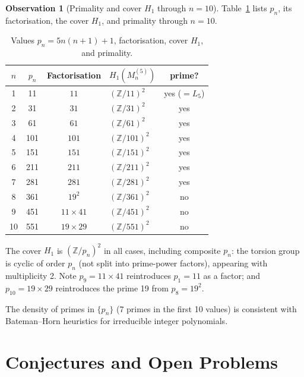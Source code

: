 \documentclass[11pt,a4paper]{article}
\theoremstyle{definition}
\newtheorem{observation}[theorem]{Observation}
\newcommand{\ZZ}{\mathbb{Z}}
\begin{document}
\begin{observation}[Primality and cover $H_1$ through $n=10$]
Table~\ref{tab:primality} lists $p_n$, its factorisation,
the cover $H_1$, and primality through $n=10$.

\begin{table}[htbp]
\centering
\caption{Values $p_n=5n(n+1)+1$, factorisation,
cover $H_1$, and primality.}
\label{tab:primality}
\begin{tabular}{ccclc}
\toprule
$n$ & $p_n$ & Factorisation & $H_1(M_n^{(5)})$ & prime? \\
\midrule
 1 &   11 & $11$           & $(\ZZ/11)^2$  & yes ($=L_5$) \\
 2 &   31 & $31$           & $(\ZZ/31)^2$  & yes \\
 3 &   61 & $61$           & $(\ZZ/61)^2$  & yes \\
 4 &  101 & $101$          & $(\ZZ/101)^2$ & yes \\
 5 &  151 & $151$          & $(\ZZ/151)^2$ & yes \\
 6 &  211 & $211$          & $(\ZZ/211)^2$ & yes \\
 7 &  281 & $281$          & $(\ZZ/281)^2$ & yes \\
 8 &  361 & $19^2$         & $(\ZZ/361)^2$ & no \\
 9 &  451 & $11\times41$   & $(\ZZ/451)^2$ & no \\
10 &  551 & $19\times29$   & $(\ZZ/551)^2$ & no \\
\bottomrule
\end{tabular}
\end{table}

The cover $H_1$ is $(\ZZ/p_n)^2$ in all cases, including
composite $p_n$: the torsion group is cyclic of order $p_n$
(not split into prime-power factors), appearing with multiplicity 2.
Note $p_9 = 11 \times 41$ reintroduces $p_1 = 11$ as a factor;
and $p_{10} = 19 \times 29$ reintroduces the prime 19
from $p_8 = 19^2$.

The density of primes in $\{p_n\}$ (7 primes in the first 10 values)
is consistent with Bateman--Horn heuristics for irreducible
integer polynomials.
\end{observation}

\section{Conjectures and Open Problems}
\label{sec:conjectures}
\end{document}
